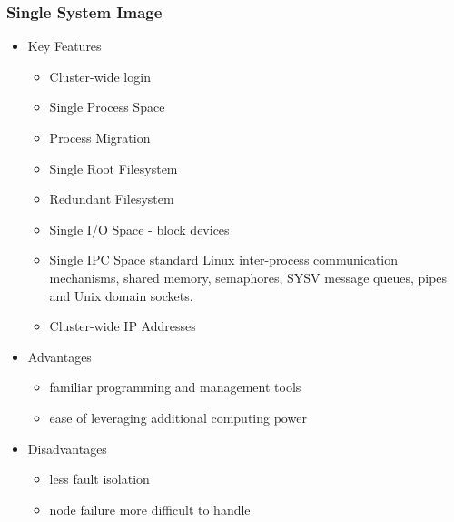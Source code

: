 \documentclass{beamer}
\begin{document}
\begin{frame}
\frametitle{Single System Image}

\begin{itemize}
\item Key Features
\begin{itemize}
\item Cluster-wide login
\item Single Process Space
\item Process Migration
\item Single Root Filesystem
\item Redundant Filesystem
\item Single I/O Space - block devices
\item Single IPC Space
standard Linux inter-process communication mechanisms, shared memory, semaphores, SYSV message queues, pipes and Unix domain sockets.
\item Cluster-wide IP Addresses
\end{itemize}
\item Advantages
\begin{itemize}
\item familiar programming and management tools
\item ease of leveraging additional computing power
\end{itemize}
\item Disadvantages
\begin{itemize}
\item less fault isolation
\item node failure more difficult to handle
\end{itemize}
\end{itemize}
\end{frame}
\end{document}
